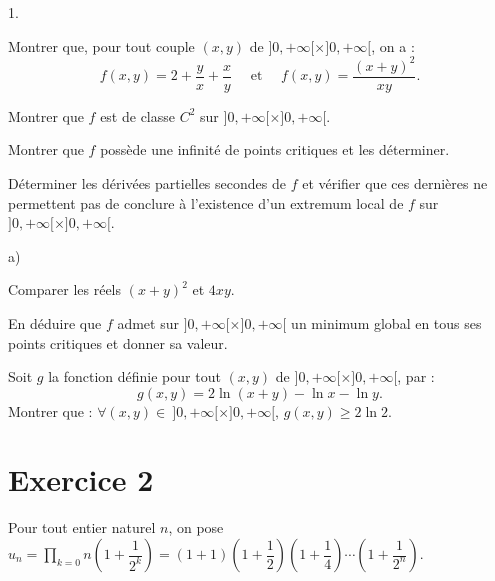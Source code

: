 \documentclass[11pt]{article}%
\begin{document}
\begin{noliste}{1.}
 \setlength{\itemsep}{4mm}
\item Montrer que, pour tout couple $(x,y)$ de $]0, + \infty \lbrack
\times
]0, + \infty \lbrack $, on a : 
\[
f(x,y) = 2 + \dfrac{y}{x} + \dfrac{x}{y}\quad \text{ et }\quad f(x,y) =
\dfrac{(x + y)^{2}}{xy}.
\]

\item Montrer que $f$ est de classe $C^{2}$ sur $]0, + \infty \lbrack
\times
]0, + \infty \lbrack $.

\item Montrer que $f$ possède une infinité de points critiques et les
déterminer.

\item Déterminer les dérivées partielles secondes de $f$ et vérifier
que ces
dernières ne permettent pas de conclure à l'existence d'un extremum
local de 
$f$ sur $]0, + \infty \lbrack \times ]0, + \infty \lbrack $.

\item 
\begin{noliste}{a)}
 \setlength{\itemsep}{2mm}
\item Comparer les réels $(x + y)^{2}$ et $4xy$.

\item En déduire que $f$ admet sur $]0, + \infty \lbrack \times ]0, +
\infty
\lbrack $ un minimum global en tous ses points critiques et donner sa
valeur.
\end{noliste}

\item Soit $g$ la fonction définie pour tout $(x,y)$ de $]0, + \infty
\lbrack
\times ]0, + \infty \lbrack $, par : 
\[
g(x,y) = 2\ln (x + y)-\ln x-\ln y.
\]
Montrer que : $\forall (x,y)\in \ ]0, + \infty \lbrack \times ]0, +
\infty \lbrack,\,g(x,y)\geq 2\ln 2$.
\end{noliste}

\section*{Exercice 2}

Pour tout entier naturel $n$, on pose $u_{n} = \prod_{k = 0}{n}\left(1
+ \dfrac 1{2^{k}}\right) = (1 + 1)\left(1 + \dfrac
1{2}\right)\left(1 + \dfrac 1{4}\right)\cdots \left(1 + \dfrac
1{2^{n}}\right)$.
\end{document}
